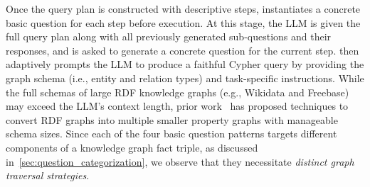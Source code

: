  Once the query plan is constructed with descriptive steps, \name{} instantiates a concrete basic question for each step before execution. At this stage, the LLM is given the full query plan along with all previously generated sub-questions and their responses, and is asked to generate a concrete question for the current step. \name{} then adaptively prompts the LLM to produce a faithful Cypher query by providing the graph schema (i.e., entity and relation types) and task-specific instructions. While the full schemas of large RDF knowledge graphs (e.g., Wikidata and Freebase) may exceed the LLM's context length, prior work~\cite{cypherbench,rdf2property} has proposed techniques to convert RDF graphs into multiple smaller property graphs with manageable schema sizes. Since each of the four basic question patterns targets different components of a knowledge graph fact triple, as discussed in~\autoref{sec:question_categorization}, we observe that they necessitate \textit{distinct graph traversal strategies}.

\begin{table}
\centering
\caption{Correspondence from graph question patterns to specific graph traversal strategies.}
\label{tab:traversal_patterns}
\end{table}

